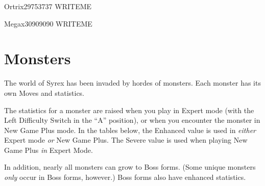 \documentclass[10pt,twocolumn]{memoir}
\begin{document}
  \begin{grizzardpage}{Ortrix}{29}{75}{37}{37}{}
    WRITEME
  \end{grizzardpage}

  \begin{grizzardpage}{Megax}{30}{90}{90}{90}{}
    WRITEME
  \end{grizzardpage}

\chapter{Monsters}\label{ch:Monsters}

The world of Syrex has been  invaded by hordes of monsters. Each monster
has its own Moves and statistics.

The statistics  for a monster  are raised when  you play in  Expert mode
(with the  Left Difficulty Switch  in the  ``A'' position), or  when you
encounter the  monster in New Game  Plus mode. In the  tables below, the
Enhanced value is  used in \emph{either} Expert mode  \emph{or} New Game
Plus. The  Severe value  is used  when playing  New Game  Plus \emph{in}
Expert Mode.



In addition,  nearly all monsters can  grow to Boss forms.  (Some unique
monsters \emph{only} occur in Boss forms, however.) Boss forms also have
enhanced statistics.

\newcommand\twice[1]{\the\numexpr#1*2\relax}
\newcommand\thrice[1]{\the\numexpr#1*3\relax}
\newcommand\fourx[1]{\the\numexpr#1*4\relax}
\newcommand\eightx[1]{\the\numexpr#1*8\relax}
\end{document}

